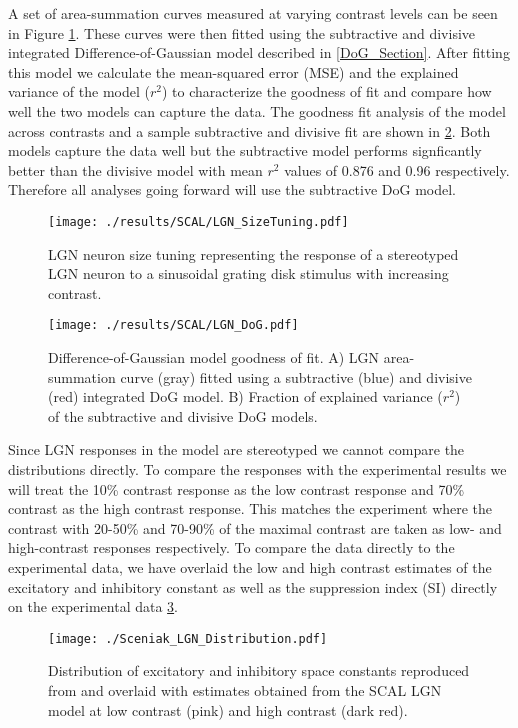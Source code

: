 A set of area-summation curves measured at varying contrast levels can
be seen in Figure \ref{LGNSizeTuning}. These curves were then fitted
using the subtractive and divisive integrated Difference-of-Gaussian
model described in \ref{DoG_Section}.  After fitting this model we
calculate the mean-squared error (MSE) and the explained variance of
the model ($r^2$) to characterize the goodness of fit and compare how
well the two models can capture the data. The goodness fit analysis of
the model across contrasts and a sample subtractive and divisive fit
are shown in \ref{LGNSizeFit}. Both models capture the data well but
the subtractive model performs signficantly better than the divisive
model with mean $r^2$ values of 0.876 and 0.96 respectively. Therefore
all analyses going forward will use the subtractive DoG model.

\begin{figure}
	\centering
    \texttt{[image: ./results/SCAL/LGN\_SizeTuning.pdf]}
	\caption{LGN neuron size tuning representing the response of a
      stereotyped LGN neuron to a sinusoidal grating disk stimulus
      with increasing contrast.}
	\label{LGNSizeTuning}
\end{figure}

\begin{figure}
	\centering
        \texttt{[image: ./results/SCAL/LGN\_DoG.pdf]}
	    \caption{Difference-of-Gaussian model goodness of fit. A) LGN
          area-summation curve (gray) fitted using a subtractive
          (blue) and divisive (red) integrated DoG model. B) Fraction
          of explained variance ($r^2$) of the subtractive and
          divisive DoG models.}
	\label{LGNSizeFit}
\end{figure}

Since LGN responses in the model are stereotyped we cannot compare the
distributions directly. To compare the responses with the experimental
results we will treat the 10\% contrast response as the low contrast
response and 70\% contrast as the high contrast response. This matches
the experiment where the contrast with 20-50\% and 70-90\% of the
maximal contrast are taken as low- and high-contrast responses
respectively. To compare the data directly to the experimental data,
we have overlaid the low and high contrast estimates of the excitatory
and inhibitory constant as well as the suppression index (SI) directly
on the experimental data \ref{LGNDistribution}.

\begin{figure}
	\centering   \texttt{[image: ./Sceniak\_LGN\_Distribution.pdf]}
	\caption{Distribution of excitatory and inhibitory space constants
      reproduced from \cite{Sceniak2006} and overlaid with estimates
      obtained from the SCAL LGN model at low contrast (pink) and high
      contrast (dark red).}
	\label{LGNDistribution}
\end{figure}

